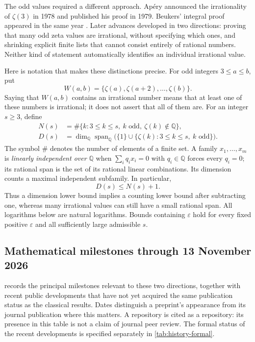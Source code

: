 \documentclass[11pt,letterpaper]{article}
\theoremstyle{definition}
\newcommand{\Q}{\mathbb Q}
\begin{document}
The odd values required a different approach.  Ap\'ery announced the
irrationality of $\zeta(3)$ in 1978 and published his proof in 1979.
Beukers' integral proof appeared in the same year
\cite{apery1979,beukers1979}.  Later advances developed in two directions:
proving that many odd zeta values are irrational, without specifying which
ones, and shrinking explicit finite lists that cannot consist entirely of
rational numbers.  Neither kind of statement automatically identifies an
individual irrational value.

Here is notation that makes these distinctions precise.  For odd integers
$3\leq a\leq b$, put
\[
 W(a,b)=\{\zeta(a),\zeta(a+2),\ldots,\zeta(b)\}.
\]
Saying that $W(a,b)$ contains an irrational number means that at least one
of these numbers is irrational; it does not assert that all of them are.
For an integer $s\geq3$, define
\begin{align*}
 N(s)&=\#\{k:3\leq k\leq s,\ k\text{ odd},\ \zeta(k)\notin\Q\},\\
 D(s)&=\dim_{\Q}\operatorname{span}_{\Q}
       \bigl(\{1\}\cup\{\zeta(k):3\leq k\leq s,\ k\text{ odd}\}\bigr).
\end{align*}
The symbol $\#$ denotes the number of elements of a finite set.  A family
$x_1,\ldots,x_m$ is \emph{linearly independent over $\Q$} when
$\sum_i q_i x_i=0$ with $q_i\in\Q$ forces every $q_i=0$; its rational span
is the set of its rational linear combinations.  Its dimension counts a
maximal independent subfamily.  In particular,
\[
                    D(s)\leq N(s)+1.
\]
Thus a dimension lower bound implies a counting lower bound after
subtracting one, whereas many irrational values can still have a small
rational span.  All logarithms below are natural logarithms.  Bounds
containing $\varepsilon$ hold for every fixed positive $\varepsilon$ and
all sufficiently large admissible $s$.

\subsection{Mathematical milestones through 13 November 2026}

 records the principal milestones relevant to
these two directions, together with recent public developments that have
not yet acquired the same publication status as the classical results.
Dates distinguish a preprint's appearance from its journal publication
where this matters.  A repository is cited as a repository: its presence
in this table is not a claim of journal peer review.  The formal status
of the recent developments is specified separately in
\cref{tab:history-formal}.
\end{document}
